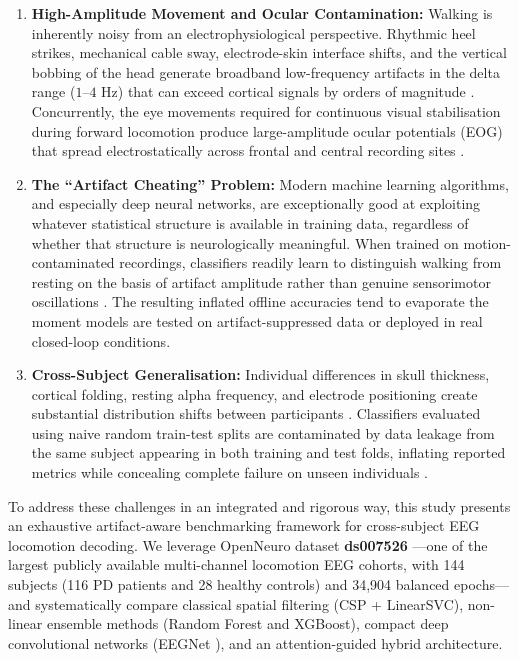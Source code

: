 \documentclass[11pt,a4paper]{article}
\begin{document}
\begin{enumerate}
    \item \textbf{High-Amplitude Movement and Ocular Contamination:} Walking is inherently noisy from an electrophysiological perspective. Rhythmic heel strikes, mechanical cable sway, electrode-skin interface shifts, and the vertical bobbing of the head generate broadband low-frequency artifacts in the delta range ($1\text{--}4\text{ Hz}$) that can exceed cortical signals by orders of magnitude \cite{gwin2011removal, castermans2014accidental}. Concurrently, the eye movements required for continuous visual stabilisation during forward locomotion produce large-amplitude ocular potentials (EOG) that spread electrostatically across frontal and central recording sites \cite{fatourechi2007ocular}.

    \item \textbf{The ``Artifact Cheating'' Problem:} Modern machine learning algorithms, and especially deep neural networks, are exceptionally good at exploiting whatever statistical structure is available in training data, regardless of whether that structure is neurologically meaningful. When trained on motion-contaminated recordings, classifiers readily learn to distinguish walking from resting on the basis of artifact amplitude rather than genuine sensorimotor oscillations \cite{schirrmeister2017eeg, tanner2023artifacts}. The resulting inflated offline accuracies tend to evaporate the moment models are tested on artifact-suppressed data or deployed in real closed-loop conditions.

    \item \textbf{Cross-Subject Generalisation:} Individual differences in skull thickness, cortical folding, resting alpha frequency, and electrode positioning create substantial distribution shifts between participants \cite{jayaram2016transfer, lotte2018review}. Classifiers evaluated using naive random train-test splits are contaminated by data leakage from the same subject appearing in both training and test folds, inflating reported metrics while concealing complete failure on unseen individuals \cite{saeedi2023validation}.
\end{enumerate}

To address these challenges in an integrated and rigorous way, this study presents an exhaustive artifact-aware benchmarking framework for cross-subject EEG locomotion decoding. We leverage OpenNeuro dataset \textbf{ds007526} \cite{orban2024dataset}---one of the largest publicly available multi-channel locomotion EEG cohorts, with 144 subjects (116 PD patients and 28 healthy controls) and 34,904 balanced epochs---and systematically compare classical spatial filtering (CSP + LinearSVC), non-linear ensemble methods (Random Forest and XGBoost), compact deep convolutional networks (EEGNet \cite{lawhern2018eegnet}), and an attention-guided hybrid architecture.
\end{document}
